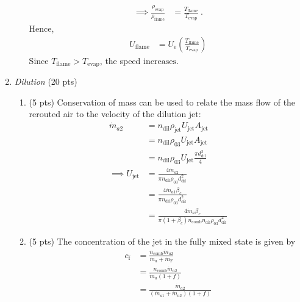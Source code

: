 \documentclass[12pt]{article}
\begin{document}
\begin{enumerate}[label=(\alph*)]
\begin{enumerate}[label=(\roman*)]
\begin{equation}
\begin{aligned}
						\implies \frac{\rho_\mathrm{evap}}{\rho_\mathrm{flame}}&=\frac{T_\mathrm{flame}}{T_\mathrm{evap}}\ .
					\end{aligned}
				\end{equation}
				Hence,
				\begin{equation}
					\begin{aligned} U_\mathrm{flame}&=\boxed{U_\mathrm{e}\left(\frac{T_\mathrm{flame}}{T_\mathrm{evap}}\right)}
					\end{aligned}
				\end{equation}
				Since $T_\mathrm{flame}>T_\mathrm{evap}$, the speed $\boxed{\mathrm{increases}}$.
			\end{enumerate}
		\item \textit{Dilution} (20 pts)
			\begin{enumerate}[label=(\roman*)]
				\item (5 pts)
					Conservation of mass can be used to relate the mass flow of the rerouted air to the velocity of the dilution jet:
					\begin{equation}
						\begin{aligned} 				
							\dot{m}_{a2}&=n_\mathrm{dil}\rho_\mathrm{jet}U_\mathrm{jet}A_{\mathrm{jet}}\\
							&=n_\mathrm{dil}\rho_\mathrm{03}U_\mathrm{jet}A_{\mathrm{jet}}\\
							&=n_\mathrm{dil}\rho_\mathrm{03}U_\mathrm{jet}\frac{\pi d_\mathrm{dil}^2}{4}\\
							\implies U_\mathrm{jet}&=\frac{4\dot{m}_{a2}}{\pi n_\mathrm{dil}\rho_{03}d_\mathrm{dil}^2}\\
							&=\frac{4\dot{m}_{a1}\beta_c}{\pi n_\mathrm{dil}\rho_{03}d_\mathrm{dil}^2}\\
							&=\boxed{\frac{4\dot{m}_{a}\beta_c}{\pi(1+\beta_c)n_\mathrm{comb} n_\mathrm{dil}\rho_{03}d_\mathrm{dil}^2}}
						\end{aligned}
					\end{equation}
				\item (5 pts)
					The concentration of the jet in the fully mixed state is given by 
					\begin{equation}
						\begin{aligned} 				
							c_\mathrm{f}&=\frac{n_\mathrm{comb}\dot{m}_{a2}}{\dot{m}_{a}+\dot{m}_\mathrm{F}}\\
							&=\frac{n_\mathrm{comb}\dot{m}_{a2}}{\dot{m}_{a}(1+f)}\\
							&=\frac{\dot{m}_{a2}}{(\dot{m}_{a1}+\dot{m}_{a2})(1+f)}\\

\end{aligned}
\end{equation}
\end{enumerate}
\end{enumerate}
\end{document}
